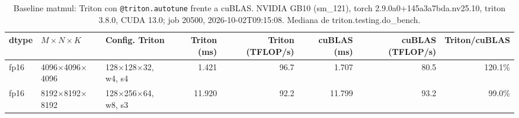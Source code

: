 \begin{table}[htbp]
  \centering\small
  \begin{tabular}{lllrrrrr}
    \toprule
    dtype & $M \times N \times K$ & Config. Triton & Triton (ms) & Triton (TFLOP/s) & cuBLAS (ms) & cuBLAS (TFLOP/s) & Triton/cuBLAS \\
    \midrule
    fp16 & 4096$\times$4096$\times$4096 & 128$\times$128$\times$32, w4, s4 & 1.421 & 96.7 & 1.707 & 80.5 & 120.1\% \\
    fp16 & 8192$\times$8192$\times$8192 & 128$\times$256$\times$64, w8, s3 & 11.920 & 92.2 & 11.799 & 93.2 & 99.0\% \\
    \bottomrule
  \end{tabular}
  \caption{Baseline matmul: Triton con \texttt{@triton.autotune} frente a cuBLAS. NVIDIA GB10 (sm\_121), torch 2.9.0a0+145a3a7bda.nv25.10, triton 3.8.0, CUDA 13.0; job 20500, 2026-10-02T09:15:08. Mediana de triton.testing.do\_bench.}
  \label{tab:baseline-matmul}
\end{table}
